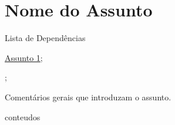 \section{Nome do Assunto }
\label{nome-do-assunto-section}

\begin{titlemize}{Lista de Dependências}
	\item \hyperref[assunto1]{Assunto 1};\\ %
	\item \hyperref[]{};
\end{titlemize}

Comentários gerais que introduzam o assunto. 

{conteudos}%



